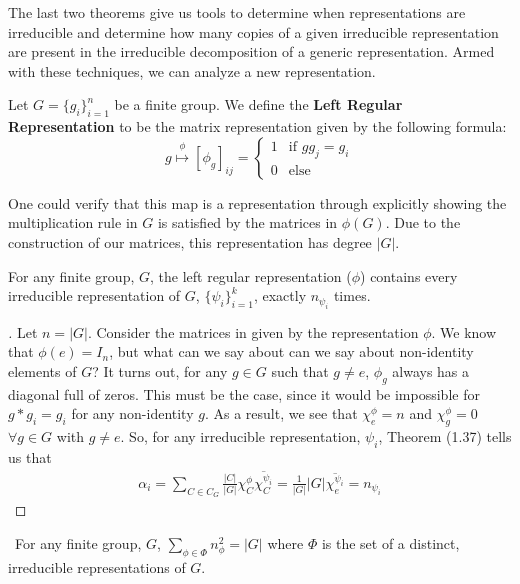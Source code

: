 The last two theorems give us tools to determine when representations are irreducible and determine how many copies of a given irreducible representation are present in the irreducible decomposition of a generic representation. Armed with these techniques, we can analyze a new representation.

\begin{definition}
	Let $G=\{g_i\}^n_{i=1}$ be a finite group. We define the \textbf{Left Regular Representation} to be the matrix representation given by the following formula:
$$g\stackrel{\phi}{\mapsto} [\phi_g]_{ij} = \begin{cases}
								1 & \text{if } gg_j = g_i \\
								0 & \text{else}
							\end{cases}$$
\end{definition}

One could verify that this map is a representation through explicitly showing the multiplication rule in $G$ is satisfied by the matrices in $\phi(G)$. Due to the construction of our matrices, this representation has degree $|G|$. 

\begin{theorem}
	For any finite group, $G$, the left regular representation ($\phi$) contains every irreducible representation of $G$, $\{\psi_i\}_{i=1}^k$, exactly $n_{\psi_i}$ times.
\end{theorem}

\noindent\begin{proof}[\cite{Tung}] Let $n=|G|$. Consider the matrices in given by the representation $\phi$. We know that $\phi(e) = I_n$, but what can we say about can we say about non-identity elements of $G$? It turns out, for any $g\in G$ such that $g\neq e$, $\phi_g$ always has a diagonal full of zeros. This must be the case, since it would be impossible for $g *g_i = g_i$  for any non-identity $g$. As a result, we see that $\chi^\phi_e = n$ and $\chi^\phi_g = 0$ $\forall g \in G$ with $g \neq e$. So, for any irreducible representation, $\psi_i$, Theorem (1.37) tells us that 
\begin{equation}
	\begin{aligned}
		\alpha_i = \sum_{C\in C_G} \frac{|C|}{|G|} \chi^\phi_C \overline{\chi_C^{\psi_i}} = \frac{1}{|G|}|G| \overline{\chi_e^{\psi_i}} = n_{\psi_i}
	\end{aligned}
\end{equation}
\end{proof}

\begin{corrolary}
\	For any finite group, $G$, $\sum_{\phi \in \Phi} n_\phi^2 = |G|$ where $\Phi$ is the set of a distinct, irreducible representations of $G$.
\end{corrolary}

